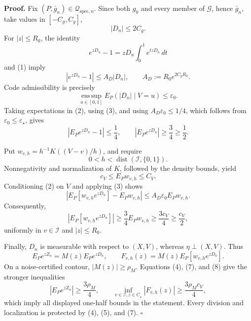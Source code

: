 \textbf{Proof.}
Fix \((P,\bar g_n)\in\mathcal Q_{\mathrm{spec},n}\).  Since both \(g_0\) and every member of \(\mathcal G\), hence \(\bar g_n\), take values in \([-C_g,C_g]\),
\[
 |D_n|\le2C_g. \tag{1}
\]
For \(|z|\le R_0\), the identity
\[
 e^{zD_n}-1=zD_n\int_0^1e^{tzD_n}\,dt
\]
and (1) imply
\[
 |e^{zD_n}-1|\le A_D|D_n|,
 \qquad A_D:=R_0e^{2C_gR_0}. \tag{2}
\]
Code admissibility is precisely
\[
 \operatorname*{ess\,sup}_{u\in[0,1]}E_P(|D_n|\mid V=u)\le\varepsilon_0. \tag{3}
\]
Taking expectations in (2), using (3), and using \(A_D\varepsilon_0\le1/4\), which follows from \(\varepsilon_0\le\varepsilon_\star\), gives
\[
 |E_Pe^{zD_n}-1|\le\frac14,
 \qquad |E_Pe^{zD_n}|\ge\frac34\ge\frac12. \tag{4}
\]

Put \(w_{v,h}=h^{-1}K((V-v)/h)\), and require
\[
 0<h<\operatorname{dist}(\mathcal I,\{0,1\}). \tag{5}
\]
Nonnegativity and normalization of \(K\), followed by the density bounds, yield
\[
 c_V\le E_Pw_{v,h}\le C_V. \tag{6}
\]
Conditioning (2) on \(V\) and applying (3) shows
\[
 \left|E_P[w_{v,h}e^{zD_n}]-E_Pw_{v,h}\right|
 \le A_D\varepsilon_0E_Pw_{v,h}.
\]
Consequently,
\[
 |E_P[w_{v,h}e^{zD_n}]|
 \ge\frac34E_Pw_{v,h}\ge\frac{3c_V}{4}\ge\frac{c_V}{2}, \tag{7}
\]
uniformly in \(v\in\mathcal I\) and \(|z|\le R_0\).

Finally, \(D_n\) is measurable with respect to \((X,V)\), whereas \(\eta\perp(X,V)\).  Thus
\[
 E_Pe^{zZ_n}=M(z)E_Pe^{zD_n},
 \qquad
 F_{v,h}(z)=M(z)E_P[w_{v,h}e^{zD_n}]. \tag{8}
\]
On a noise-certified contour, \(|M(z)|\ge\rho_M\).  Equations (4), (7), and (8) give the stronger inequalities
\[
 |E_Pe^{zZ_n}|\ge\frac{3\rho_M}{4},
 \qquad
 \inf_{v\in\mathcal I,z\in C_\star}|F_{v,h}(z)|
 \ge\frac{3\rho_Mc_V}{4}, \tag{9}
\]
which imply all displayed one-half bounds in the statement.  Every division and localization is protected by (4), (5), and (7). \(\square\)